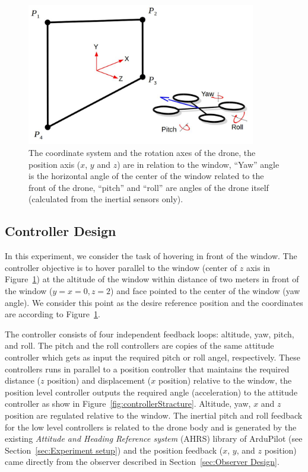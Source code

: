 \documentclass[ twoside, 12pt ]{article}
\begin{document}
\begin{figure} %
    \centerline{\includegraphics[width=100mm]{axis.jpg}}
    \caption{The coordinate system and the rotation axes of the drone, the position axis ($x$, $y$ and $z$) are in relation to the window, ``Yaw'' angle is the horizontal angle of the center of the window related to the front of the drone, ``pitch'' and ``roll'' are angles of the drone itself (calculated from the inertial sensors only).}
    \label{fig:axis}
\end{figure}

\subsection{Controller Design}
\label{sec:Controller Design}

In this experiment, we consider the task of hovering in front of the window. The controller objective is to hover parallel to the window (center of $z$ axis in Figure~\ref{fig:axis}) at the altitude of the window within distance of two meters in front of the window ($y=x=0 , z=2$) and face pointed to the center of the window (yaw angle).
We consider this point as the desire reference position and the coordinates are according to Figure~\ref{fig:axis}.

The controller consists of four independent feedback loops: altitude, yaw, pitch, and roll.
The pitch and the roll controllers are copies of the same attitude controller which gets as input the required pitch or roll angel, respectively. These controllers runs in parallel to a position controller that maintains the required distance ($z$ position) and displacement ($x$ position) relative to the window, the position level controller outputs the required angle (acceleration) to the attitude controller as show in Figure~\ref{fig:controllerStracture}.
Altitude, yaw, $x$ and $z$ position are regulated relative to the window.
The inertial pitch and roll feedback for the low level controllers is related to the drone body and is generated by the existing \textit{Attitude and Heading Reference system} (AHRS) library of ArduPilot (see Section~\ref{sec:Experiment setup}) and the position feedback ($x$, $y$, and $z$ position) came directly from the observer described in Section~\ref{sec:Observer Design}.
\end{document}
